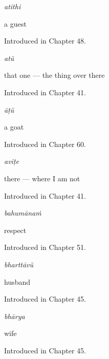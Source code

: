 \noindent\begin{minipage}[t]{\linewidth}
\raggedright
\textbf{}\enspace\emph{atithi}\par
\small a guest\par
\footnotesize Introduced in Chapter 48.
\end{minipage}\par\medskip

\noindent\begin{minipage}[t]{\linewidth}
\raggedright
\textbf{}\enspace\emph{atŭ}\par
\small that one — the thing over there\par
\footnotesize Introduced in Chapter 41.
\end{minipage}\par\medskip

\noindent\begin{minipage}[t]{\linewidth}
\raggedright
\textbf{}\enspace\emph{āṭŭ}\par
\small a goat\par
\footnotesize Introduced in Chapter 60.
\end{minipage}\par\medskip

\noindent\begin{minipage}[t]{\linewidth}
\raggedright
\textbf{}\enspace\emph{aviṭe}\par
\small there — where I am not\par
\footnotesize Introduced in Chapter 41.
\end{minipage}\par\medskip

\noindent\begin{minipage}[t]{\linewidth}
\raggedright
\textbf{}\enspace\emph{bahumānaṁ}\par
\small respect\par
\footnotesize Introduced in Chapter 51.
\end{minipage}\par\medskip

\noindent\begin{minipage}[t]{\linewidth}
\raggedright
\textbf{}\enspace\emph{bharttāvŭ}\par
\small husband\par
\footnotesize Introduced in Chapter 45.
\end{minipage}\par\medskip

\noindent\begin{minipage}[t]{\linewidth}
\raggedright
\textbf{}\enspace\emph{bhārya}\par
\small wife\par
\footnotesize Introduced in Chapter 45.
\end{minipage}\par\medskip

